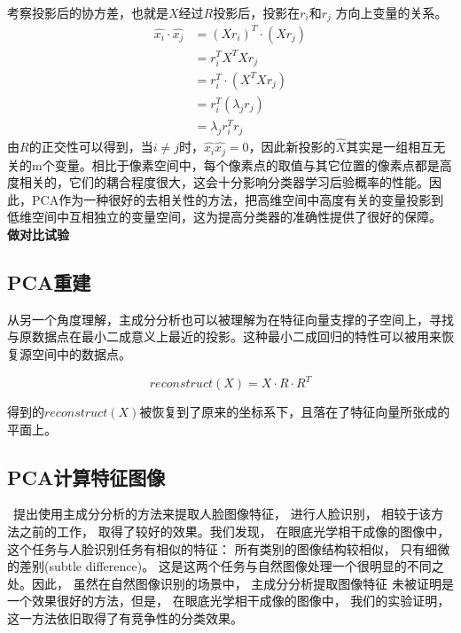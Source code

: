     考察投影后的协方差，也就是$X$经过$R$投影后，投影在$r_i$和$r_j$ 方向上变量的关系。
    \begin{equation}
    \begin{split}
        \hat{x_i} \cdot \hat{x_j} & = (Xr_i)^T \cdot (Xr_j) \\
        & = r_i^T X^T X r_j \\
        & = r_i^T\cdot(X^T X r_j) \\
        & = r_i^T(\lambda_j r_j) \\
        & = \lambda_j r_i^T r_j 
    \end{split}
    \end{equation}
    由$R$的正交性可以得到，当$i \ne j$时，$\hat{x_i} \hat{x_j} = 0$，因此新投影的$\hat{X}$其实是一组相互无关的m个变量。相比于像素空间中，每个像素点的取值与其它位置的像素点都是高度相关的，它们的耦合程度很大，这会十分影响分类器学习后验概率的性能。因此，PCA作为一种很好的去相关性的方法，把高维空间中高度有关的变量投影到低维空间中互相独立的变量空间，这为提高分类器的准确性提供了很好的保障。 \textbf{做对比试验}
 
    \subsection{PCA重建}
    从另一个角度理解，主成分分析也可以被理解为在特征向量支撑的子空间上，寻找与原数据点在最小二成意义上最近的投影。这种最小二成回归的特性可以被用来恢复源空间中的数据点。

    \begin{equation}
    reconstruct(X) = X \cdot R \cdot R^T        
    \end{equation}

    得到的$reconstruct(X)$被恢复到了原来的坐标系下，且落在了特征向量所张成的平面上。
    
    \subsection{PCA计算特征图像}
        ~\cite{turk1991eigenfaces}提出使用主成分分析的方法来提取人脸图像特征， 进行人脸识别， 相较于该方法之前的工作， 取得了较好的效果。我们发现， 在眼底光学相干成像的图像中， 这个任务与人脸识别任务有相似的特征： 所有类别的图像结构较相似， 只有细微的差别(subtle difference)。 这是这两个任务与自然图像处理一个很明显的不同之处。因此， 虽然在自然图像识别的场景中， 主成分分析提取图像特征 未被证明是一个效果很好的方法，但是， 在眼底光学相干成像的图像中， 我们的实验证明， 这一方法依旧取得了有竞争性的分类效果。 

